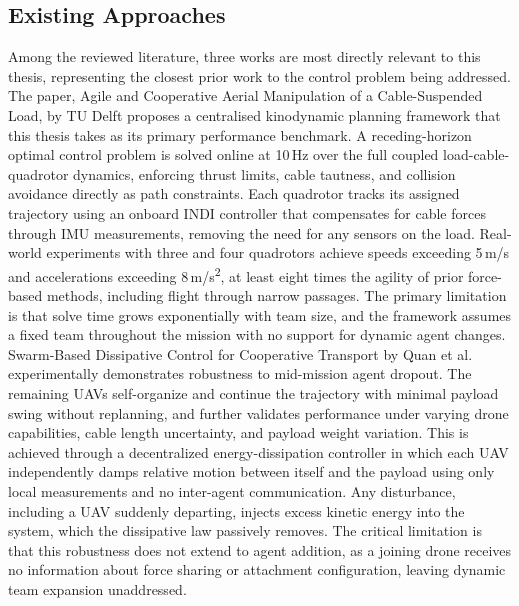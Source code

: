 \subsection{Existing Approaches}

Among the reviewed literature, three works are most directly relevant to this thesis, representing the closest prior work to the control problem being addressed. \\

The paper, Agile and Cooperative Aerial Manipulation of a Cable-Suspended Load, by TU Delft \cite{tudelft} proposes a centralised kinodynamic planning framework that this thesis takes as its primary performance benchmark. A receding-horizon optimal control problem is solved online at 10\,Hz over the full coupled load-cable-quadrotor dynamics, enforcing thrust limits, cable tautness, and collision avoidance directly as path constraints. Each quadrotor tracks its assigned trajectory using an onboard INDI controller that compensates for cable forces through IMU measurements, removing the need for any sensors on the load. Real-world experiments with three and four quadrotors achieve speeds exceeding 5\,m/s and accelerations exceeding 8\,m/s\textsuperscript{2}, at least eight times the agility of prior force-based methods, including flight through narrow passages. The primary limitation is that solve time grows exponentially with team size, and the framework assumes a fixed team throughout the mission with no support for dynamic agent changes. \\

Swarm-Based Dissipative Control for Cooperative Transport by Quan et al.\ \cite{quan2025swarm} experimentally demonstrates robustness to mid-mission agent dropout. The remaining UAVs self-organize and continue the trajectory with minimal payload swing without replanning, and further validates performance under varying drone capabilities, cable length uncertainty, and payload weight variation. This is achieved through a decentralized energy-dissipation controller in which each UAV independently damps relative motion between itself and the payload using only local measurements and no inter-agent communication. Any disturbance, including a UAV suddenly departing, injects excess kinetic energy into the system, which the dissipative law passively removes. The critical limitation is that this robustness does not extend to agent addition, as a joining drone receives no information about force sharing or attachment configuration, leaving dynamic team expansion unaddressed. \\

